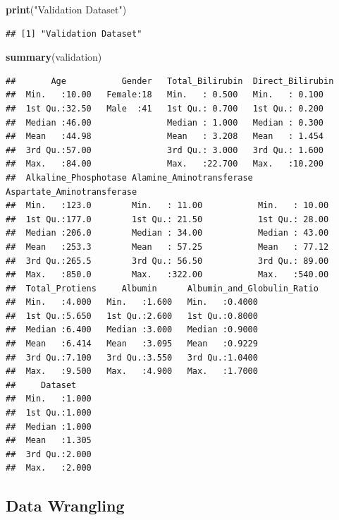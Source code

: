 \documentclass[]{article}
\newenvironment{Shaded}{\begin{snugshade}}{\end{snugshade}}
\newcommand{\KeywordTok}[1]{\textcolor[rgb]{0.13,0.29,0.53}{\textbf{#1}}}
\newcommand{\NormalTok}[1]{#1}
\newcommand{\StringTok}[1]{\textcolor[rgb]{0.31,0.60,0.02}{#1}}
\begin{document}
\begin{Shaded}
\begin{Highlighting}[]
\KeywordTok{print}\NormalTok{(}\StringTok{"Validation Dataset"}\NormalTok{)}
\end{Highlighting}
\end{Shaded}

\begin{verbatim}
## [1] "Validation Dataset"
\end{verbatim}

\begin{Shaded}
\begin{Highlighting}[]
\KeywordTok{summary}\NormalTok{(validation)}
\end{Highlighting}
\end{Shaded}

\begin{verbatim}
##       Age           Gender   Total_Bilirubin  Direct_Bilirubin
##  Min.   :10.00   Female:18   Min.   : 0.500   Min.   : 0.100  
##  1st Qu.:32.50   Male  :41   1st Qu.: 0.700   1st Qu.: 0.200  
##  Median :46.00               Median : 1.000   Median : 0.300  
##  Mean   :44.98               Mean   : 3.208   Mean   : 1.454  
##  3rd Qu.:57.00               3rd Qu.: 3.000   3rd Qu.: 1.600  
##  Max.   :84.00               Max.   :22.700   Max.   :10.200  
##  Alkaline_Phosphotase Alamine_Aminotransferase Aspartate_Aminotransferase
##  Min.   :123.0        Min.   : 11.00           Min.   : 10.00            
##  1st Qu.:177.0        1st Qu.: 21.50           1st Qu.: 28.00            
##  Median :206.0        Median : 34.00           Median : 43.00            
##  Mean   :253.3        Mean   : 57.25           Mean   : 77.12            
##  3rd Qu.:265.5        3rd Qu.: 56.50           3rd Qu.: 89.00            
##  Max.   :850.0        Max.   :322.00           Max.   :540.00            
##  Total_Protiens     Albumin      Albumin_and_Globulin_Ratio
##  Min.   :4.000   Min.   :1.600   Min.   :0.4000            
##  1st Qu.:5.650   1st Qu.:2.600   1st Qu.:0.8000            
##  Median :6.400   Median :3.000   Median :0.9000            
##  Mean   :6.414   Mean   :3.095   Mean   :0.9229            
##  3rd Qu.:7.100   3rd Qu.:3.550   3rd Qu.:1.0400            
##  Max.   :9.500   Max.   :4.900   Max.   :1.7000            
##     Dataset     
##  Min.   :1.000  
##  1st Qu.:1.000  
##  Median :1.000  
##  Mean   :1.305  
##  3rd Qu.:2.000  
##  Max.   :2.000
\end{verbatim}

\subsection{Data Wrangling}
\label{sec:dw}
\end{document}
